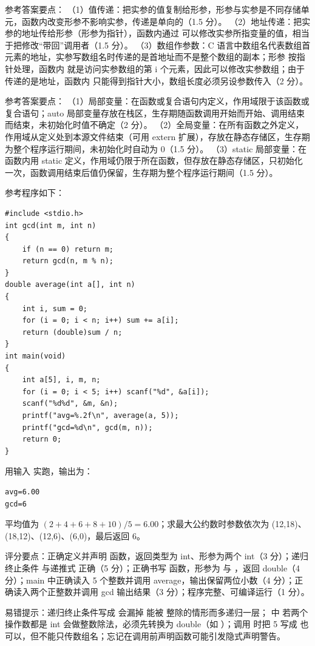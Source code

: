 \documentclass[a4paper,11pt]{article}
\begin{document}
\q 参考答案要点：
（1）值传递：把实参的值复制给形参，形参与实参是不同存储单元，函数内改变形参不影响实参，传递是单向的（1.5 分）。
（2）地址传递：把实参的地址传给形参（形参为指针），函数内通过  可以修改实参所指变量的值，相当于把修改“带回”调用者（1.5 分）。
（3）数组作参数：C 语言中数组名代表数组首元素的地址，实参写数组名时传递的是首地址而不是整个数组的副本；形参  按指针处理，函数内  就是访问实参数组的第 i 个元素，因此可以修改实参数组；由于传递的是地址，函数内  只能得到指针大小，数组长度必须另设参数传入（2 分）。

\q 参考答案要点：
（1）局部变量：在函数或复合语句内定义，作用域限于该函数或复合语句；auto 局部变量存放在栈区，生存期随函数调用开始而开始、调用结束而结束，未初始化时值不确定（2 分）。
（2）全局变量：在所有函数之外定义，作用域从定义处到本源文件结束（可用 extern 扩展），存放在静态存储区，生存期为整个程序运行期间，未初始化时自动为 0（1.5 分）。
（3）static 局部变量：在函数内用 static 定义，作用域仍限于所在函数，但存放在静态存储区，只初始化一次，函数调用结束后值仍保留，生存期为整个程序运行期间（1.5 分）。


\q 参考程序如下：
\begin{lstlisting}[language={[custom]C}]
#include <stdio.h>
int gcd(int m, int n)
{
    if (n == 0) return m;
    return gcd(n, m % n);
}
double average(int a[], int n)
{
    int i, sum = 0;
    for (i = 0; i < n; i++) sum += a[i];
    return (double)sum / n;
}
int main(void)
{
    int a[5], i, m, n;
    for (i = 0; i < 5; i++) scanf("%d", &a[i]);
    scanf("%d%d", &m, &n);
    printf("avg=%.2f\n", average(a, 5));
    printf("gcd=%d\n", gcd(m, n));
    return 0;
}
\end{lstlisting}
\begin{analysis}用输入  实跑，输出为：
\begin{lstlisting}
avg=6.00
gcd=6
\end{lstlisting}
平均值为 $(2+4+6+8+10)/5=6.00$；求最大公约数时参数依次为 (12,18)、(18,12)、(12,6)、(6,0)，最后返回 6。\end{analysis}
\begin{analysis}评分要点：正确定义并声明  函数，返回类型为 int、形参为两个 int（3 分）；递归终止条件  与递推式  正确（5 分）；正确书写  函数，形参为  与 ，返回 double（4 分）；main 中正确读入 5 个整数并调用 average，输出保留两位小数（4 分）；正确读入两个正整数并调用 gcd 输出结果（3 分）；程序完整、可编译运行（1 分）。\end{analysis}
\begin{analysis}易错提示：递归终止条件写成  会漏掉  能被  整除的情形而多递归一层； 中  若两个操作数都是 int 会做整数除法，必须先转换为 double（如 ）；调用  时把 5 写成  也可以，但不能只传数组名；忘记在调用前声明函数可能引发隐式声明警告。\end{analysis}
\end{document}
